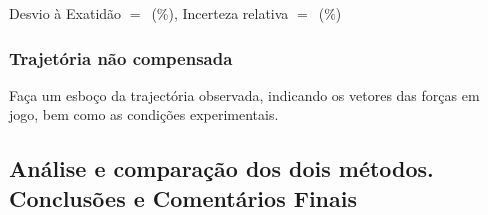\documentclass[a4paper,12pt]{article}  %
\begin{document}
\noindent  Desvio à Exatidão $=$~\underline{\makebox[1cm][r]{~}}(\%), 
Incerteza relativa $=$~\underline{\makebox[1cm][r]{~}}($\%$) 

\newpage

\subsubsection{\sf Trajetória não compensada}
Faça um esboço da trajectória observada, indicando os vetores das forças em jogo, bem como as condições experimentais.
\begin{center}
\framebox[18cm]{\rule{0pt}{6.5cm}}
\end{center}

\subsection{\sf Análise e comparação dos dois métodos. Conclusões e Comentários Finais}
\noindent\underline{\makebox[\textwidth][r]{~}} \\
\noindent\underline{\makebox[\textwidth][r]{~}} \\
\noindent\underline{\makebox[\textwidth][r]{~}} \\
\noindent\underline{\makebox[\textwidth][r]{~}} \\
\noindent\underline{\makebox[\textwidth][r]{~}} \\
\noindent\underline{\makebox[\textwidth][r]{~}} \\
\noindent\underline{\makebox[\textwidth][r]{~}} \\
\noindent\underline{\makebox[\textwidth][r]{~}} \\
\noindent\underline{\makebox[\textwidth][r]{~}} \\
\noindent\underline{\makebox[\textwidth][r]{~}} \\
\noindent\underline{\makebox[\textwidth][r]{~}} \\
\noindent\underline{\makebox[\textwidth][r]{~}} \\
\noindent\underline{\makebox[17cm][r]{~}} \\



\end{document}
